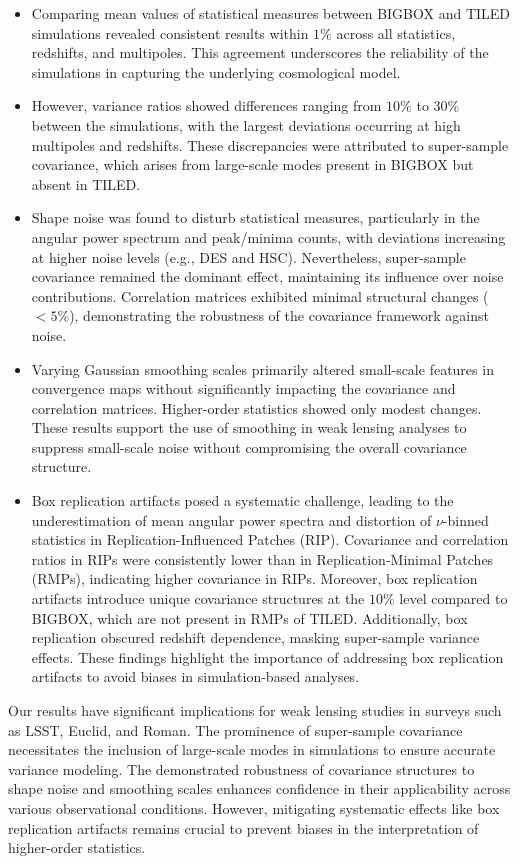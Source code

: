 \begin{itemize} 
    \item Comparing mean values of statistical measures between BIGBOX and TILED simulations revealed consistent results within $1\%$ across all statistics, redshifts, and multipoles. This agreement underscores the reliability of the simulations in capturing the underlying cosmological model. 
    \item However, variance ratios showed differences ranging from $10\%$ to $30\%$ between the simulations, with the largest deviations occurring at high multipoles and redshifts. These discrepancies were attributed to super-sample covariance, which arises from large-scale modes present in BIGBOX but absent in TILED. 
    \item Shape noise was found to disturb statistical measures, particularly in the angular power spectrum and peak/minima counts, with deviations increasing at higher noise levels (e.g., DES and HSC). Nevertheless, super-sample covariance remained the dominant effect, maintaining its influence over noise contributions. Correlation matrices exhibited minimal structural changes ($<5\%$), demonstrating the robustness of the covariance framework against noise. 
    \item Varying Gaussian smoothing scales primarily altered small-scale features in convergence maps without significantly impacting the covariance and correlation matrices. Higher-order statistics showed only modest changes. These results support the use of smoothing in weak lensing analyses to suppress small-scale noise without compromising the overall covariance structure. 
    \item Box replication artifacts posed a systematic challenge, leading to the underestimation of mean angular power spectra and distortion of $\nu$-binned statistics in Replication-Influenced Patches (RIP). Covariance and correlation ratios in RIPs were consistently lower than in Replication-Minimal Patches (RMPs), indicating higher covariance in RIPs. Moreover, box replication artifacts introduce unique covariance structures at the $10\%$ level compared to BIGBOX, which are not present in RMPs of TILED. Additionally, box replication obscured redshift dependence, masking super-sample variance effects. These findings highlight the importance of addressing box replication artifacts to avoid biases in simulation-based analyses. 
\end{itemize}

Our results have significant implications for weak lensing studies in surveys such as LSST, Euclid, and Roman. The prominence of super-sample covariance necessitates the inclusion of large-scale modes in simulations to ensure accurate variance modeling. The demonstrated robustness of covariance structures to shape noise and smoothing scales enhances confidence in their applicability across various observational conditions. However, mitigating systematic effects like box replication artifacts remains crucial to prevent biases in the interpretation of higher-order statistics.

